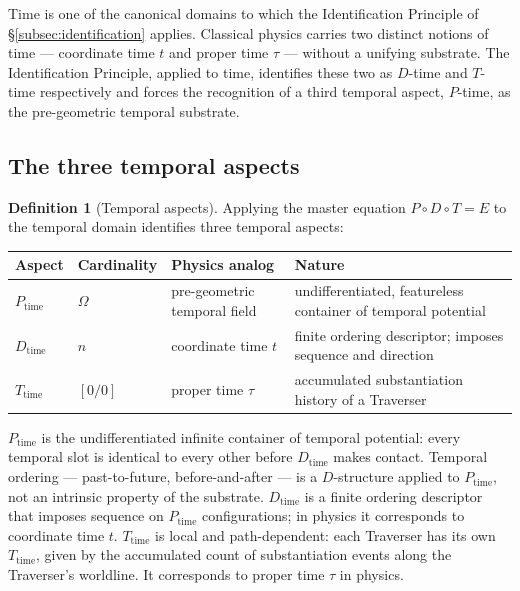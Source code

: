 \documentclass[11pt,a4paper]{article}
\theoremstyle{definition}
\newtheorem{definition}[theorem]{Definition}
\theoremstyle{remark}
\newcommand{\PDT}{\ensuremath{P{\circ}D{\circ}T}}
\begin{document}
Time is one of the canonical domains to which the Identification Principle of \S\ref{subsec:identification} applies. Classical physics carries two distinct notions of time --- coordinate time $t$ and proper time $\tau$ --- without a unifying substrate. The Identification Principle, applied to time, identifies these two as $D$-time and $T$-time respectively and forces the recognition of a third temporal aspect, $P$-time, as the pre-geometric temporal substrate.

\subsection{The three temporal aspects}

\begin{definition}[Temporal aspects]\label{def:temporal-aspects}
Applying the master equation $\PDT = E$ to the temporal domain identifies three temporal aspects:

\begin{center}
\begin{tabular}{@{}llll@{}}
\toprule
\textbf{Aspect} & \textbf{Cardinality} & \textbf{Physics analog} & \textbf{Nature}\\
\midrule
$P_{\text{time}}$ & $\Omega$ & pre-geometric temporal field
  & undifferentiated, featureless container of temporal potential\\
$D_{\text{time}}$ & $n$ & coordinate time $t$
  & finite ordering descriptor; imposes sequence and direction\\
$T_{\text{time}}$ & $[0/0]$ & proper time $\tau$
  & accumulated substantiation history of a Traverser\\
\bottomrule
\end{tabular}
\end{center}
\end{definition}

$P_{\text{time}}$ is the undifferentiated infinite container of temporal potential: every temporal slot is identical to every other before $D_{\text{time}}$ makes contact. Temporal ordering --- past-to-future, before-and-after --- is a $D$-structure applied to $P_{\text{time}}$, not an intrinsic property of the substrate. $D_{\text{time}}$ is a finite ordering descriptor that imposes sequence on $P_{\text{time}}$ configurations; in physics it corresponds to coordinate time $t$. $T_{\text{time}}$ is local and path-dependent: each Traverser has its own $T_{\text{time}}$, given by the accumulated count of substantiation events along the Traverser's worldline. It corresponds to proper time $\tau$ in physics.
\end{document}
